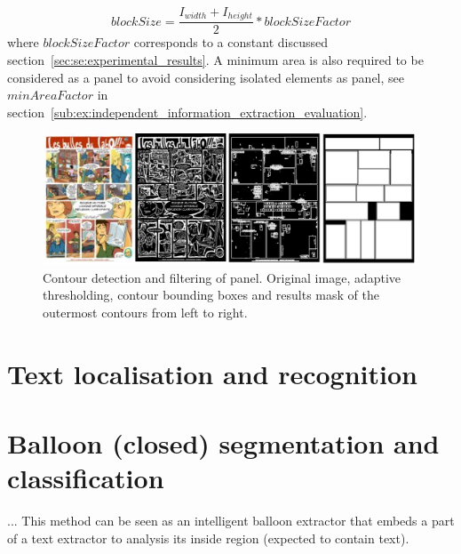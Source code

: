 \begin{equation}
\label{eq:panel_blockSize}
	blockSize = \frac{I_{width} + I_{height}}{2} * blockSizeFactor
\end{equation}
where $blockSizeFactor$ corresponds to a constant discussed section~\ref{sec:se:experimental_results}. 
A minimum area is also required to be considered as a panel to avoid considering isolated elements as panel, see $minAreaFactor$ in section~\ref{sub:ex:independent_information_extraction_evaluation}.


 \begin{figure}[!ht]  %
   \centering
  \includegraphics[width=1.0\textwidth]{panel_detection.png}
  \caption{Contour detection and filtering of panel.
  Original image, adaptive thresholding, contour bounding boxes and results mask of the outermost contours from left to right.}
  \label{fig:panel}
 \end{figure}


\section{Text localisation and recognition} %
\label{sec:in:text_localisation_and_recognition}


\section{Balloon (closed) segmentation and classification}
\label{ssec:in:balloon}

...
This method can be seen as an intelligent balloon extractor that embeds a part of a text extractor to analysis its inside region (expected to contain text).



